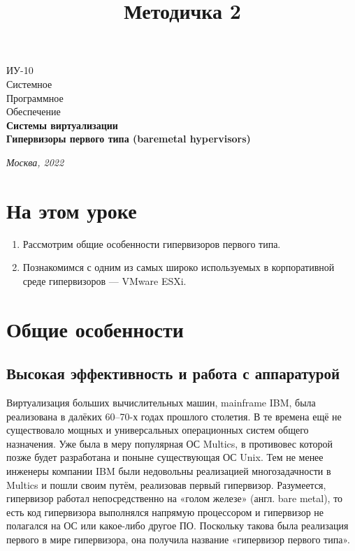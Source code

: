 \documentclass[14pt, a4paper]{article}
\title{Методичка 2}
\begin{document}
\begin{titlepage}
    \topmargin=216pt
    \newpage
    \hangindent=0.7cm
    \huge ИУ-10\\
    Системное\\
    Программное\\
    Обеспечение\\
    \textbf{Системы виртуализации\\ Гипервизоры первого типа (baremetal hypervisors)}

    \vspace{10cm}

    \begin{center}
        \small\textit{Москва, 2022}
    \end{center}
\end{titlepage}
\section*{На этом уроке}
\begin{enumerate}
    \item Рассмотрим общие особенности гипервизоров первого типа.
    \item Познакомимся с одним из самых широко используемых в корпоративной среде гипервизоров
    — VMware ESXi.
\end{enumerate}
\tableofcontents
\newpage

\section*{Общие особенности}

\subsection*{Высокая эффективность и работа с аппаратурой}

Виртуализация больших вычислительных машин, mainframe IBM, была реализована в далёких
60–70-х годах прошлого столетия. В те времена ещё не существовало мощных и универсальных
операционных систем общего назначения. Уже была в меру популярная ОС Multics, в противовес
которой позже будет разработана и поныне существующая ОС Unix. Тем не менее инженеры
компании IBM были недовольны реализацией многозадачности в Multics и пошли своим путём,
реализовав первый гипервизор. Разумеется, гипервизор работал непосредственно на «голом железе»
(англ. bare metal), то есть код гипервизора выполнялся напрямую процессором и гипервизор не
полагался на ОС или какое-либо другое ПО. Поскольку такова была реализация первого в мире
гипервизора, она получила название «гипервизор первого типа».
\end{document}
